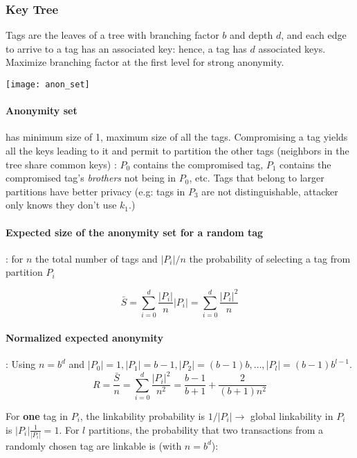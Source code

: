 \documentclass[6pt]{scrartcl}
\begin{document}
\begin{multicols}{4}
\subsubsection{Key Tree}
Tags are the leaves of a tree with branching factor $b$ and depth $d$, and each edge to arrive to a tag has an associated key: hence, a tag has $d$ associated keys. Maximize branching factor at the first level for strong anonymity.
\begin{center}
\texttt{[image: anon\_set]}
\end{center}

\paragraph{Anonymity set} has minimum size of 1, maximum size of all the tags. Compromising a tag yields all the keys leading to it and permit to partition the other tags (neighbors in the tree share common keys) : $P_0$ contains the compromised tag, $P_1$ contains the compromised tag's \emph{brothers} not being in $P_0$, etc. Tags that belong to larger partitions have better privacy (e.g: tags in $P_3$ are not distinguishable, attacker only knows they don't use $k_1$.)

\paragraph{Expected size of the anonymity set for a random tag}: for $n$ the total number of tags and $|P_i|/n$ the probability of selecting a tag from partition $P_i$

\begin{equation*}
\bar S = \sum_{i=0}^d \frac {|P_i|}n|P_i| =  \sum_{i=0}^d \frac {|P_i|^2}n
\end{equation*}

\paragraph{Normalized expected anonymity} : 
Using $n = b^d$ and $|P_0| = 1, |P_1| = b-1, |P_2| = (b-1)b, \ldots, |P_l| = (b-1)b^{l-1}$.
\begin{equation*}
	R = \frac{\bar{S}}n = \sum_{i=0}^d \frac {|P_i|^2}{n^2} = \frac{b-1}{b+1} + \frac2{(b+1)n^2}
\end{equation*}

For \textbf{one} tag in $P_i$, the linkability probability is  $1/|P_i| \rightarrow$ global linkability in $P_i$ is $|P_i|\frac1{|P_i|} = 1$. For $l$ partitions, the probability that two transactions from a randomly chosen tag are linkable is (with $n = b^d$):


\end{multicols}
\end{document}
